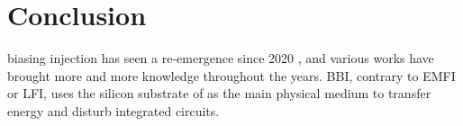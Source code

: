 
\section{Conclusion}
	 biasing injection has seen a re-emergence since 2020 \cite{bbiColin}, and various works have brought more and more knowledge throughout the years.
	BBI, contrary to EMFI or LFI, uses the silicon substrate of as the main physical medium to transfer energy and disturb integrated circuits.